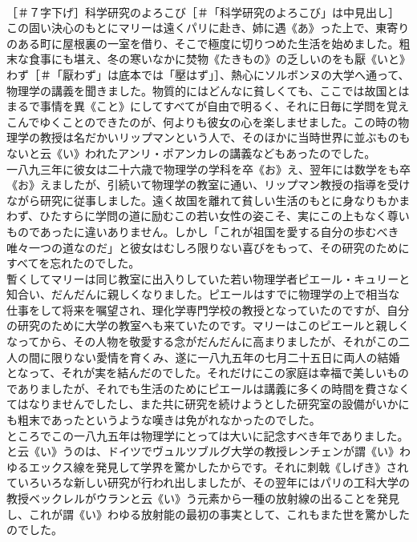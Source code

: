 \documentclass[8pt]{extreport}
\begin{document}
\begin{CJK}{UTF8}{min}
\\	［＃７字下げ］科学研究のよろこび［＃「科学研究のよろこび」は中見出し］
\\	この固い決心のもとにマリーは遠くパリに赴き、姉に遇《あ》った上で、東寄りのある町に屋根裏の一室を借り、そこで極度に切りつめた生活を始めました。粗末な食事にも堪え、冬の寒いなかに焚物《たきもの》の乏しいのをも厭《いと》わず［＃「厭わず」は底本では「壓はず」］、熱心にソルボンヌの大学へ通って、物理学の講義を聞きました。物質的にはどんなに貧しくても、ここでは故国とはまるで事情を異《こと》にしてすべてが自由で明るく、それに日毎に学問を覚えこんでゆくことのできたのが、何よりも彼女の心を楽しませました。この時の物理学の教授は名だかいリップマンという人で、そのほかに当時世界に並ぶものもないと云《い》われたアンリ・ポアンカレの講義などもあったのでした。
\\	一八九三年に彼女は二十六歳で物理学の学科を卒《お》え、翌年には数学をも卒《お》えましたが、引続いて物理学の教室に通い、リップマン教授の指導を受けながら研究に従事しました。遠く故国を離れて貧しい生活のもとに身なりもかまわず、ひたすらに学問の道に励むこの若い女性の姿こそ、実にこの上もなく尊いものであったに違いありません。しかし「これが祖国を愛する自分の歩むべき唯々一つの道なのだ」と彼女はむしろ限りない喜びをもって、その研究のためにすべてを忘れたのでした。
\\	暫くしてマリーは同じ教室に出入りしていた若い物理学者ピエール・キュリーと知合い、だんだんに親しくなりました。ピエールはすでに物理学の上で相当な仕事をして将来を嘱望され、理化学専門学校の教授となっていたのですが、自分の研究のために大学の教室へも来ていたのです。マリーはこのピエールと親しくなってから、その人物を敬愛する念がだんだんに高まりましたが、それがこの二人の間に限りない愛情を育くみ、遂に一八九五年の七月二十五日に両人の結婚となって、それが実を結んだのでした。それだけにこの家庭は幸福で美しいものでありましたが、それでも生活のためにピエールは講義に多くの時間を費さなくてはなりませんでしたし、また共に研究を続けようとした研究室の設備がいかにも粗末であったというような嘆きは免がれなかったのでした。
\\	ところでこの一八九五年は物理学にとっては大いに記念すべき年でありました。と云《い》うのは、ドイツでヴュルツブルグ大学の教授レンチェンが謂《い》わゆるエックス線を発見して学界を驚かしたからです。それに刺戟《しげき》されていろいろな新しい研究が行われ出しましたが、その翌年にはパリの工科大学の教授ベックレルがウランと云《い》う元素から一種の放射線の出ることを発見し、これが謂《い》わゆる放射能の最初の事実として、これもまた世を驚かしたのでした。

\end{CJK}
\end{document}
